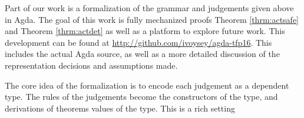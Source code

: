 Part of our work is a formalization of the grammar and judgements given
above in Agda. The goal of this work is fully mechanized proofs Theorem
\ref{thrm:actsafe} and Theorem \ref{thrm:actdet} as well as a platform to
explore future work. This development can be found at
\url{http://github.com/ivoysey/agda-tfp16}. This includes the actual Agda
source, as well as a more detailed discussion of the representation
decisions and assumptions made.

The core idea of the formalization is to encode each judgement as a
dependent type. The rules of the judgements become the constructors of the
type, and derivations of theorems values of the type. This is a rich
setting


